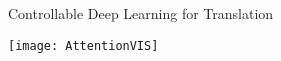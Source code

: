 





\begin{frame}{Controllable Deep Learning for Translation}
  \begin{center}
    \texttt{[image: AttentionVIS]}
  \end{center}
\end{frame}


